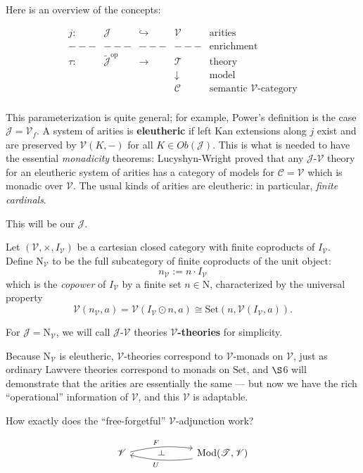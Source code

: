 \documentclass{amsart}
\theoremstyle{definition}
\def\ld{\rotatebox[origin=c]{-90}{$\dashv$}} %
\newcommand{\Set}{\mathrm{Set}}
\newcommand{\Mod}{\mathrm{Mod}}
\newcommand{\op}{\mathrm{op}}
\newcommand{\NN}{\mathrm{N}}
\newcommand{\V}{\mathscr{V}}
\newcommand{\C}{\mathscr{C}}
\newcommand{\J}{\mathscr{J}}
\newcommand{\T}{\mathscr{T}}
\newcommand{\maps}{\colon}
\begin{document}
Here is an overview of the concepts: 

\[\begin{array}{ccccl}
j\maps & \J & \hookrightarrow & \V & \text{arities}\\
---& --- & --- & --- & \text{enrichment}\\
\tau\maps & \tilde{\J}^\op & \to & \T & \text{theory}\\
& & & \downarrow & \text{model}\\
& & & \C & \text{semantic $\V$-category}\\
\end{array}\]

This parameterization is quite general; for example, Power's definition is the case $\J = \V_f$. A system of arities is \textbf{eleutheric} if left Kan extensions along $j$ exist and are preserved by $\V(K,-)$ for all $K \in Ob(\J)$. This is what is needed to have the essential \textit{monadicity} theorems: Lucyshyn-Wright proved that any $\J$-$\V$ theory for an eleutheric system of arities has a category of models for $\C = \V$ which is monadic over $\V$. The usual kinds of arities are eleutheric: in particular, \textit{finite cardinals}.

This will be our $\J$.

Let $(\V,\times,I_\V)$ be a cartesian closed category with finite coproducts of $I_\V$. Define $\NN_\V$ to be the full subcategory of finite coproducts of the unit object: $$n_\V := n \cdot I_\V$$ which is the \textit{copower} of $I_\V$ by a finite set $n \in \NN$, characterized by the universal property
\begin{equation}
\V(n_\V,a) = \V(I_\V \odot n,a) \cong \Set(n,\V(I_\V,a)).
\end{equation}

For $\J = \NN_\V$, we will call $\J$-$\V$ theories \textbf{$\V$-theories} for simplicity.

Because $\NN_\V$ is eleutheric, $\V$-theories correspond to $\V$-monads on $\V$, just as ordinary Lawvere theories correspond to monads on $\Set$, and $\S$6 will demonstrate that the arities are essentially the same --- but now we have the rich ``operational'' information of $\V$, and this $\V$ is adaptable.

How exactly does the ``free-forgetful'' $\V$-adjunction work?

\[\begin{tikzcd}
\V \arrow[bend left=10,below]{rr}{F}
& \ld &
\arrow[bend left=10,above]{ll}{U} \Mod(\T,\V)
\end{tikzcd}\]
\end{document}
